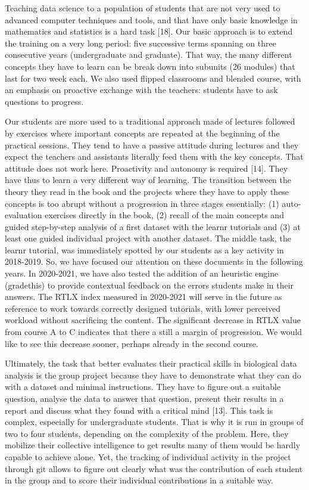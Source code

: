 \documentclass[
]{article}
\begin{document}
Teaching data science to a population of students that are not very used
to advanced computer techniques and tools, and that have only basic
knowledge in mathematics and statistics is a hard task {[}18{]}. Our
basic approach is to extend the training on a very long period: five
successive terms spanning on three consecutive years (undergraduate and
graduate). That way, the many different concepts they have to learn can
be break down into subunits (26 modules) that last for two week each. We
also used flipped classrooms and blended course, with an emphasis on
proactive exchange with the teachers: students have to ask questions to
progress.

Our students are more used to a traditional approach made of lectures
followed by exercises where important concepts are repeated at the
beginning of the practical sessions. They tend to have a passive
attitude during lectures and they expect the teachers and assistants
literally feed them with the key concepts. That attitude does not work
here. Proactivity and autonomy is required {[}14{]}. They have thus to
learn a very different way of learning. The transition between the
theory they read in the book and the projects where they have to apply
these concepts is too abrupt without a progression in three stages
essentially: (1) auto-evaluation exercises directly in the book, (2)
recall of the main concepts and guided step-by-step analysis of a first
dataset with the learnr tutorials and (3) at least one guided individual
project with another dataset. The middle task, the learnr tutorial, was
immediately spotted by our students as a key activity in 2018-2019. So,
we have focused our attention on these documents in the following years.
In 2020-2021, we have also tested the addition of an heuristic engine
(gradethis) to provide contextual feedback on the errors students make
in their answers. The RTLX index measured in 2020-2021 will serve in the
future as reference to work towards correctly designed tutorials, with
lower perceived workload without sacrificing the content. The
significant decrease in RTLX value from course A to C indicates that
there a still a margin of progression. We would like to see this
decrease sooner, perhaps already in the second course.

Ultimately, the task that better evaluates their practical skills in
biological data analysis is the group project because they have to
demonstrate what they can do with a dataset and minimal instructions.
They have to figure out a suitable question, analyse the data to answer
that question, present their results in a report and discuss what they
found with a critical mind {[}13{]}. This task is complex, especially
for undergraduate students. That is why it is run in groups of two to
four students, depending on the complexity of the problem. Here, they
mobilize their collective intelligence to get results many of them would
be hardly capable to achieve alone. Yet, the tracking of individual
activity in the project through git allows to figure out clearly what
was the contribution of each student in the group and to score their
individual contributions in a suitable way.
\end{document}
